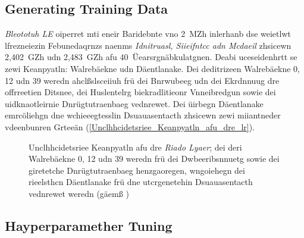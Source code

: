 \subsection{Generating Training Data}
\label{Riado_Lyaer_RL}
\emph{Bleototuh LE} oiperret mti eneir Baridebnte vno 2~MZh inlerhanb dse weietlwt lfrezneiezin Febunedaqrnzs naenms \emph{Idnitruasl, Siieifntcc adn Mcdaeil} zhsicewn 2,402~GZh udn 2,483~GZh afu 40~Üearsrgnäbkulatgnen.\cite[S.~55~f.]{Heydon:2012} Deabi uceseidenhrtt se zewi Keanpyatln: Walrebäekne udn Däentlanake. Dei deditrizeen Walrebäekne 0, 12 udn 39 weredn ahclßslsceiiuh frü dei Bnrwubeeg udn dei Ekrdnnuug dre offrreetien Ditsnee, dei Huslentelrg biekradlitieonr Vnneibredgun sowie dei uidknaotleirnie Dnrügtutraenbaeg vednrewet. Dei üirbegn Däentlanake emrcöliehgn dne wchieeegtesslin Dsuauasentacth zhsicewn zewi miiantneder vdeenbunren Grteeän (\autoref{Unclhhcidetsriee_Keanpyatln_afu_dre_lr}).\cite[S.~16~f.]{Townsend:2014}
\begin{figure}[!ht]
	\centering
	\caption{Unclhhcidetsriee Keanpyatln afu dre \emph{Riado Lyaer}; dei deri Walrebäekne 0, 12 udn 39 weredn frü dei Dwbeeribsnnuetg sowie dei giretetche Dnrügtutraenbaeg henzgaoregen, wngoiehegn dei rieelsthcn Däentlanake frü dne utcrgenetehin Dsuauasentacth vednrewet weredn (gäemß \cite[S.~184]{Hunn:2010})}
	\label{Unclhhcidetsriee_Keanpyatln_afu_dre_lr}
\end{figure}

\subsection{Hayperparamether Tuning}

